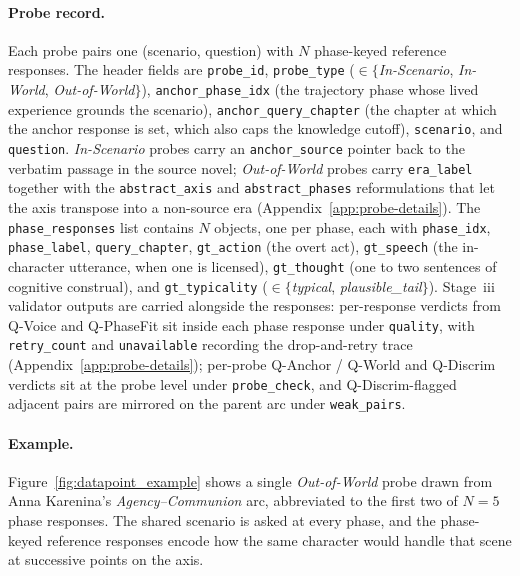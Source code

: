 \documentclass{llmxive}
\begin{document}
\paragraph{Probe record.}
Each probe pairs one (scenario, question) with $N$ phase-keyed reference responses. The header fields are \texttt{probe\_id}, \texttt{probe\_type} ($\in\{$\emph{In-Scenario}, \emph{In-World}, \emph{Out-of-World}$\}$), \texttt{anchor\_phase\_idx} (the trajectory phase whose lived experience grounds the scenario), \texttt{anchor\_query\_chapter} (the chapter at which the anchor response is set, which also caps the knowledge cutoff), \texttt{scenario}, and \texttt{question}. \emph{In-Scenario} probes carry an \texttt{anchor\_source} pointer back to the verbatim passage in the source novel; \emph{Out-of-World} probes carry \texttt{era\_label} together with the \texttt{abstract\_axis} and \texttt{abstract\_phases} reformulations that let the axis transpose into a non-source era (Appendix~\ref{app:probe-details}). The \texttt{phase\_responses} list contains $N$ objects, one per phase, each with \texttt{phase\_idx}, \texttt{phase\_label}, \texttt{query\_chapter}, \texttt{gt\_action} (the overt act), \texttt{gt\_speech} (the in-character utterance, when one is licensed), \texttt{gt\_thought} (one to two sentences of cognitive construal), and \texttt{gt\_typicality} ($\in\{$\emph{typical}, \emph{plausible\_tail}$\}$). Stage~iii validator outputs are carried alongside the responses: per-response verdicts from Q-Voice and Q-PhaseFit sit inside each phase response under \texttt{quality}, with \texttt{retry\_count} and \texttt{unavailable} recording the drop-and-retry trace (Appendix~\ref{app:probe-details}); per-probe Q-Anchor / Q-World and Q-Discrim verdicts sit at the probe level under \texttt{probe\_check}, and Q-Discrim-flagged adjacent pairs are mirrored on the parent arc under \texttt{weak\_pairs}.

\paragraph{Example.}
Figure~\ref{fig:datapoint_example} shows a single \emph{Out-of-World} probe drawn from Anna Karenina's \emph{Agency--Communion} arc, abbreviated to the first two of $N{=}5$ phase responses. The shared scenario is asked at every phase, and the phase-keyed reference responses encode how the same character would handle that scene at successive points on the axis.
\end{document}
